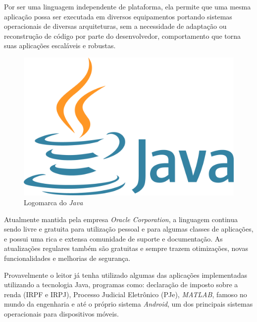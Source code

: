 \documentclass[
	12pt,			%
	openright,		%
	oneside,	
	a4paper,		%
	english,		%
	brazil			%
]{abntex2/abntex2}  %
\begin{document}
			Por ser uma linguagem independente de plataforma, ela permite que uma mesma aplicação possa ser executada em diversos equipamentos portando sistemas operacionais de diversas arquiteturas, sem a necessidade de adaptação ou reconstrução de código por parte do desenvolvedor, comportamento que torna suas aplicações escaláveis e robustas.
		
			\begin{figure}[ht]
				\begin{center}
				
					\caption{Logomarca do \textit{Java}}
					\label{java-img}
								
					\includegraphics[scale=0.04]{img/java-logo}
					
					
				\end{center}
			\end{figure}
		
			Atualmente mantida pela empresa \textit{Oracle Corporation}, a linguagem continua sendo livre e gratuita para utilização pessoal e para algumas classes de aplicações, e possui uma rica e extensa comunidade de suporte e documentação. As atualizações regulares também são gratuitas e sempre trazem otimizações, novas funcionalidades e melhorias de segurança.

			Provavelmente o leitor já tenha utilizado algumas das aplicações implementadas utilizando a tecnologia Java, programas como: declaração de imposto sobre a renda (IRPF e IRPJ), Processo Judicial Eletrônico (PJe), \textit{MATLAB}, famoso no mundo da engenharia e até o próprio sistema \textit{Android}, um dos principais sistemas operacionais para dispositivos móveis.
		
\end{document}

